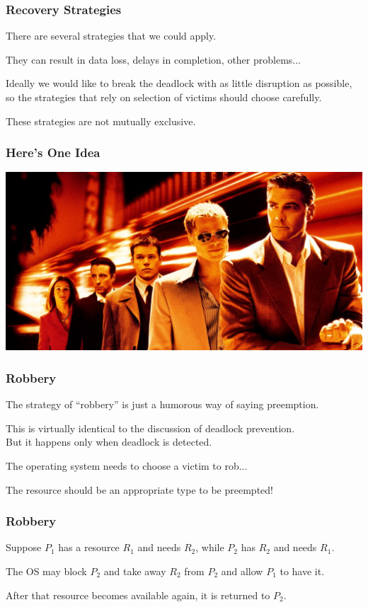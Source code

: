 \begin{frame}
\frametitle{Recovery Strategies}

There are several strategies that we could apply.

They can result in data loss, delays in completion, other problems...

Ideally we would like to break the deadlock with as little disruption as possible, so the strategies that rely on selection of victims should choose carefully. 

These strategies are not mutually exclusive.

\end{frame}


\begin{frame}
\frametitle{Here's One Idea}

\begin{center}
	\includegraphics[width=\textwidth]{images/oceans-eleven.jpeg}
\end{center}

\end{frame}


\begin{frame}
\frametitle{Robbery}

The strategy of ``robbery'' is just a humorous way of saying preemption. 

This is virtually identical to the discussion of deadlock prevention.\\
\quad But it happens  only when deadlock is detected. 

The operating system needs to choose a victim to rob...

The resource should be an appropriate type to be preempted!


\end{frame}

\begin{frame}
\frametitle{Robbery}


Suppose $P_{1}$ has a resource $R_{1}$ and needs $R_{2}$, while $P_{2}$ has $R_{2}$ and needs $R_{1}$. 

The OS may block $P_{2}$ and take away $R_{2}$ from $P_{2}$ and allow $P_{1}$ to have it. 

After that resource becomes available again, it is returned to $P_{2}$.


\end{frame}

